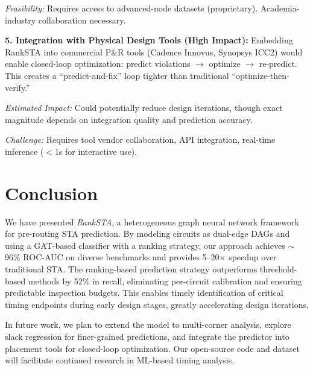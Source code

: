 \documentclass[10pt,twocolumn,journal]{IEEEtran}
\begin{document}
\textit{Feasibility:} Requires access to advanced-node datasets (proprietary). Academia-industry collaboration necessary.

\textbf{5. Integration with Physical Design Tools (High Impact):}
Embedding RankSTA into commercial P\&R tools (Cadence Innovus, Synopsys ICC2) would enable closed-loop optimization: predict violations $\rightarrow$ optimize $\rightarrow$ re-predict. This creates a ``predict-and-fix'' loop tighter than traditional ``optimize-then-verify.''

\textit{Estimated Impact:} Could potentially reduce design iterations, though exact magnitude depends on integration quality and prediction accuracy.

\textit{Challenge:} Requires tool vendor collaboration, API integration, real-time inference ($<$1s for interactive use).

\section{Conclusion}
\label{sec:conclusion}

We have presented \textit{RankSTA}, a heterogeneous graph neural network framework for pre-routing STA prediction. By modeling circuits as dual-edge DAGs and using a GAT-based classifier with a ranking strategy, our approach achieves $\sim$96\% ROC-AUC on diverse benchmarks and provides 5--20$\times$ speedup over traditional STA. The ranking-based prediction strategy outperforms threshold-based methods by 52\% in recall, eliminating per-circuit calibration and ensuring predictable inspection budgets. This enables timely identification of critical timing endpoints during early design stages, greatly accelerating design iterations.

In future work, we plan to extend the model to multi-corner analysis, explore slack regression for finer-grained predictions, and integrate the predictor into placement tools for closed-loop optimization. Our open-source code and dataset will facilitate continued research in ML-based timing analysis.

\end{document}
